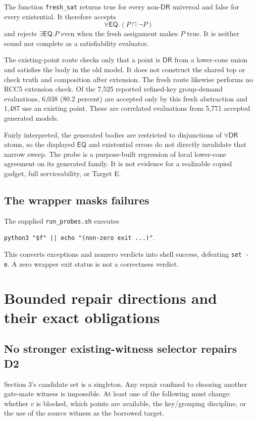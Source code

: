 \documentclass[11pt]{article}
\newcommand{\DR}{\mathsf{DR}}
\newcommand{\EQ}{\mathsf{EQ}}
\begin{document}
The function \texttt{fresh\_sat} returns true for every non-$\DR$ universal and false
for every existential. It therefore accepts
\[
  \forall\EQ.(P\sqcap\neg P)
\]
and rejects $\exists\EQ.P$ even when the fresh assignment makes $P$ true. It is neither
sound nor complete as a satisfiability evaluator.

The existing-point route checks only that a point is $\DR$ from a lower-cone union and
satisfies the body in the old model. It does not construct the shared top or check truth
and composition after extension. The fresh route likewise performs no RCC5 extension
check. Of the 7,525 reported refined-key group-demand evaluations, 6,038 (80.2 percent)
are accepted only by this fresh abstraction and 1,487 use an existing point. These are
correlated evaluations from 5,771 accepted generated models.

Fairly interpreted, the generated bodies are restricted to disjunctions of
$\forall\DR$ atoms, so the displayed $\EQ$ and existential errors do not directly
invalidate that narrow sweep. The probe is a purpose-built regression of local
lower-cone agreement on its generated family. It is not evidence for a realizable copied
gadget, full serviceability, or Target E.

\subsection{The wrapper masks failures}

The supplied \texttt{run\_probes.sh} executes
\begin{center}
\texttt{python3 "\$f" || echo "(non-zero exit ...)"}.
\end{center}
This converts exceptions and nonzero verdicts into shell success, defeating
\texttt{set -e}. A zero wrapper exit status is not a correctness verdict.

\section{Bounded repair directions and their exact obligations}

\subsection{No stronger existing-witness selector repairs D2}

Section 3's candidate set is a singleton. Any repair confined to choosing another
gate-mate witness is impossible. At least one of the following must change: whether $v$
is blocked, which points are available, the key/grouping discipline, or the use of the
source witness as the borrowed target.
\end{document}
